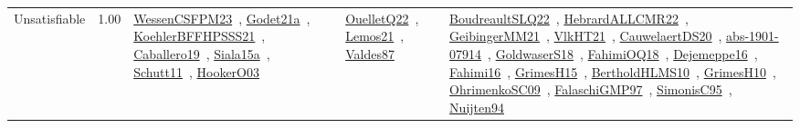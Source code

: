 {\begin{longtable}{p{3cm}r>{\raggedright\arraybackslash}p{6cm}>{\raggedright\arraybackslash}p{6cm}>{\raggedright\arraybackslash}p{8cm}}
\index{Unsatisfiable}\index{Concepts!Unsatisfiable}Unsatisfiable &  1.00 & \href{../works/WessenCSFPM23.pdf}{WessenCSFPM23}~\cite{WessenCSFPM23}, \href{../works/Godet21a.pdf}{Godet21a}~\cite{Godet21a}, \href{../works/KoehlerBFFHPSSS21.pdf}{KoehlerBFFHPSSS21}~\cite{KoehlerBFFHPSSS21}, \href{../works/Caballero19.pdf}{Caballero19}~\cite{Caballero19}, \href{../works/Siala15a.pdf}{Siala15a}~\cite{Siala15a}, \href{../works/Schutt11.pdf}{Schutt11}~\cite{Schutt11}, \href{../works/HookerO03.pdf}{HookerO03}~\cite{HookerO03} & \href{../works/OuelletQ22.pdf}{OuelletQ22}~\cite{OuelletQ22}, \href{../works/Lemos21.pdf}{Lemos21}~\cite{Lemos21}, \href{../works/Valdes87.pdf}{Valdes87}~\cite{Valdes87} & \href{../works/BoudreaultSLQ22.pdf}{BoudreaultSLQ22}~\cite{BoudreaultSLQ22}, \href{../works/HebrardALLCMR22.pdf}{HebrardALLCMR22}~\cite{HebrardALLCMR22}, \href{../works/GeibingerMM21.pdf}{GeibingerMM21}~\cite{GeibingerMM21}, \href{../works/VlkHT21.pdf}{VlkHT21}~\cite{VlkHT21}, \href{../works/CauwelaertDS20.pdf}{CauwelaertDS20}~\cite{CauwelaertDS20}, \href{../works/abs-1901-07914.pdf}{abs-1901-07914}~\cite{abs-1901-07914}, \href{../works/GoldwaserS18.pdf}{GoldwaserS18}~\cite{GoldwaserS18}, \href{../works/FahimiOQ18.pdf}{FahimiOQ18}~\cite{FahimiOQ18}, \href{../works/Dejemeppe16.pdf}{Dejemeppe16}~\cite{Dejemeppe16}, \href{../works/Fahimi16.pdf}{Fahimi16}~\cite{Fahimi16}, \href{../works/GrimesH15.pdf}{GrimesH15}~\cite{GrimesH15}, \href{../works/BertholdHLMS10.pdf}{BertholdHLMS10}~\cite{BertholdHLMS10}, \href{../works/GrimesH10.pdf}{GrimesH10}~\cite{GrimesH10}, \href{../works/OhrimenkoSC09.pdf}{OhrimenkoSC09}~\cite{OhrimenkoSC09}, \href{../works/FalaschiGMP97.pdf}{FalaschiGMP97}~\cite{FalaschiGMP97}, \href{../works/SimonisC95.pdf}{SimonisC95}~\cite{SimonisC95}, \href{../works/Nuijten94.pdf}{Nuijten94}~\cite{Nuijten94}\\

\end{longtable}}
